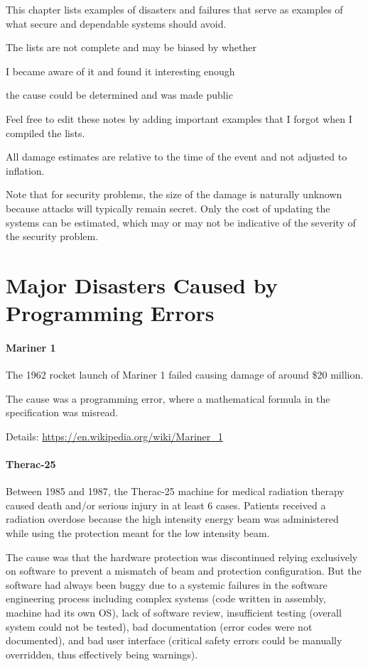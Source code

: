 This chapter lists examples of disasters and failures that serve as examples of what secure and dependable systems should avoid.

The lists are not complete and may be biased by whether
\begin{compactitem}
 \item I became aware of it and found it interesting enough
 \item the cause could be determined and was made public
\end{compactitem}
Feel free to edit these notes by adding important examples that I forgot when I compiled the lists.

All damage estimates are relative to the time of the event and not adjusted to inflation.

Note that for security problems, the size of the damage is naturally unknown because attacks will typically remain secret.
Only the cost of updating the systems can be estimated, which may or may not be indicative of the severity of the security problem.

\section{Major Disasters Caused by Programming Errors}

\paragraph{Mariner 1}
The 1962 rocket launch of Mariner 1 failed causing damage of around \$20 million.

The cause was a programming error, where a mathematical formula in the specification was misread.

Details: \url{https://en.wikipedia.org/wiki/Mariner_1}

\paragraph{Therac-25}
Between 1985 and 1987, the Therac-25 machine for medical radiation therapy caused death and/or serious injury in at least $6$ cases.
Patients received a radiation overdose because the high intensity energy beam was administered while using the protection meant for the low intensity beam.

The cause was that the hardware protection was discontinued relying exclusively on software to prevent a mismatch of beam and protection configuration.
But the software had always been buggy due to a systemic failures in the software engineering process including complex systems (code written in assembly, machine had its own OS), lack of software review, insufficient testing (overall system could not be tested), bad documentation (error codes were not documented), and bad user interface (critical safety errors could be manually overridden, thus effectively being warnings).

